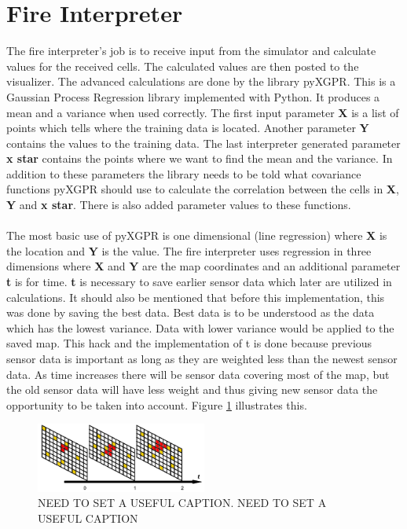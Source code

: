 \section{Fire Interpreter}

The fire interpreter's job is to receive input from the simulator and 
calculate values for the received cells. The calculated values are then posted to the visualizer. The advanced calculations are done by the library pyXGPR. This is a Gaussian Process Regression library implemented with Python. It produces a mean and a variance when used correctly. The first input parameter \textbf{X} is a list of points which tells where the training data is located. Another parameter \textbf{Y} contains the values to the training data. The last interpreter generated parameter \textbf{x star} contains the points where we want to find the mean and the variance. In addition to these parameters the library needs to be told what covariance functions pyXGPR should use to calculate the correlation between the cells in \textbf{X}, \textbf{Y} and \textbf{x star}. There is also added parameter values to these functions.
\\\\
The most basic use of pyXGPR is one dimensional (line regression) where \textbf{X} is the location and \textbf{Y} is the value. The fire interpreter uses regression in three dimensions where \textbf{X} and \textbf{Y} are the map coordinates and an additional parameter \textbf{t} is for time. \textbf{t} is necessary to save earlier sensor data which later are utilized in calculations. It should also be mentioned that before this implementation, this was done by saving the best data. Best data is to be understood as the data which has the lowest variance. Data with lower variance would be applied to the saved map. This hack and the implementation of t is done because previous sensor data is important as long as they are weighted less than the newest sensor data. As time increases there will be sensor data covering most of the map, but the old sensor data will have less weight and thus giving new sensor data the opportunity to be taken into account. Figure \ref{fig:timeElapse} illustrates this.


\begin{figure}[here]
  \centering
      \includegraphics[width=0.5\textwidth]{solution/graphics/timeElapse.png}
  \caption{NEED TO SET A USEFUL CAPTION. NEED TO SET A USEFUL CAPTION}
  \label{fig:timeElapse}
\end{figure}


